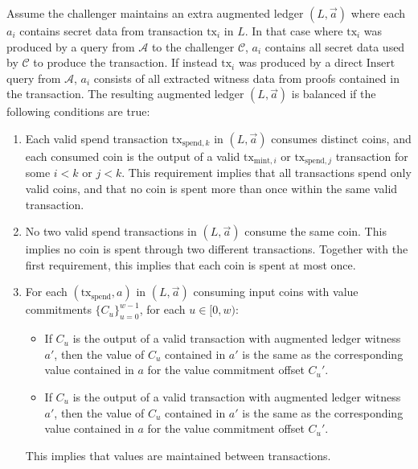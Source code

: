 \documentclass{llncs}
\begin{document}
Assume the challenger maintains an extra augmented ledger $(L, \vec{a})$ where each $a_i$ contains secret data from transaction $\text{tx}_i$ in $L$.
In that case where $\text{tx}_i$ was produced by a query from $\mathcal{A}$ to the challenger $\mathcal{C}$, $a_i$ contains all secret data used by $\mathcal{C}$ to produce the transaction.
If instead $\text{tx}_i$ was produced by a direct $\text{Insert}$ query from $\mathcal{A}$, $a_i$ consists of all extracted witness data from proofs contained in the transaction.
The resulting augmented ledger $(L, \vec{a})$ is balanced if the following conditions are true:
\begin{enumerate}
    \item\label{cond:distinct} Each valid spend transaction $\text{tx}_{\text{spend},k}$ in $(L, \vec{a})$ consumes distinct coins, and each consumed coin is the output of a valid $\text{tx}_{\text{mint},i}$ or $\text{tx}_{\text{spend},j}$ transaction for some $i < k$ or $j < k$.
    This requirement implies that all transactions spend only valid coins, and that no coin is spent more than once within the same valid transaction.
    
    \item\label{cond:multiple} No two valid spend transactions in $(L, \vec{a})$ consume the same coin.
    This implies no coin is spent through two different transactions.
    Together with the first requirement, this implies that each coin is spent at most once.
    
    \item\label{cond:value} For each $(\text{tx}_{\text{spend}}, a)$ in $(L, \vec{a})$ consuming input coins with value commitments $\{C_u\}_{u=0}^{w-1}$, for each $u \in [0,w)$:
    \begin{itemize}
        \item If $C_u$ is the output of a valid  transaction with augmented ledger witness $a'$, then the value of $C_u$ contained in $a'$ is the same as the corresponding value contained in $a$ for the value commitment offset $C_u'$.
        \item If $C_u$ is the output of a valid  transaction with augmented ledger witness $a'$, then the value of $C_u$ contained in $a'$ is the same as the corresponding value contained in $a$ for the value commitment offset $C_u'$.
    \end{itemize}
    This implies that values are maintained between transactions.
    

\end{enumerate}
\end{document}
